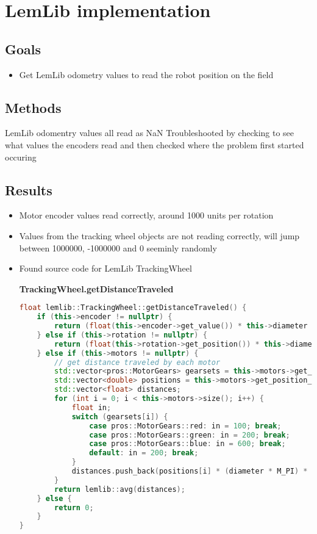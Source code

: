 \section{LemLib implementation}

\subsection{Goals}
\begin{itemize}
    \item Get LemLib odometry values to read the robot position on the field
\end{itemize}

\subsection{Methods}
LemLib odomentry values all read as NaN
Troubleshooted by checking to see what values the encoders read and then checked where the problem first started occuring

\subsection{Results}
\begin{itemize}
    \item Motor encoder values read correctly, around 1000 units per rotation
    \item Values from the tracking wheel objects are not reading correctly, will jump between 1000000, -1000000 and 0 seeminly randomly
    \item Found source code for LemLib TrackingWheel
    
    \textbf{TrackingWheel.getDistanceTraveled}
\begin{lstlisting}[language=c++]
float lemlib::TrackingWheel::getDistanceTraveled() {
    if (this->encoder != nullptr) {
        return (float(this->encoder->get_value()) * this->diameter * M_PI / 360) / this->gearRatio;
    } else if (this->rotation != nullptr) {
        return (float(this->rotation->get_position()) * this->diameter * M_PI / 36000) / this->gearRatio;
    } else if (this->motors != nullptr) {
        // get distance traveled by each motor
        std::vector<pros::MotorGears> gearsets = this->motors->get_gearing_all();
        std::vector<double> positions = this->motors->get_position_all();
        std::vector<float> distances;
        for (int i = 0; i < this->motors->size(); i++) {
            float in;
            switch (gearsets[i]) {
                case pros::MotorGears::red: in = 100; break;
                case pros::MotorGears::green: in = 200; break;
                case pros::MotorGears::blue: in = 600; break;
                default: in = 200; break;
            }
            distances.push_back(positions[i] * (diameter * M_PI) * (rpm / in));
        }
        return lemlib::avg(distances);
    } else {
        return 0;
    }
}
\end{lstlisting}
\end{itemize}

